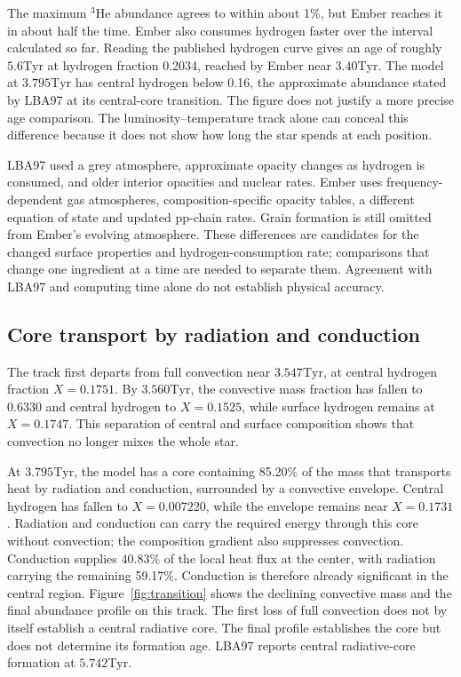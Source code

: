 \documentclass[11pt,letterpaper]{article}
\newcommand{\Tyr}{\mathrm{Tyr}}
\begin{document}
The maximum $^3$He abundance agrees to within about 1\%, but Ember reaches it
in about half the time. Ember also consumes hydrogen faster over the interval
calculated so far. Reading the published hydrogen curve gives an age of
roughly $5.6\Tyr$ at hydrogen fraction 0.2034, reached by Ember near
$3.40\Tyr$. The model at $3.795\Tyr$ has central hydrogen below 0.16,
the approximate abundance stated by LBA97 at its central-core transition. The figure does not justify a more precise age comparison.
The luminosity--temperature track alone can conceal this difference because
it does not show how long the star spends at each position.

LBA97 used a grey atmosphere, approximate opacity changes as hydrogen is
consumed, and older interior opacities and nuclear rates. Ember uses
frequency-dependent gas atmospheres, composition-specific opacity tables,
a different equation of state and updated pp-chain rates. Grain formation
is still omitted from Ember's evolving atmosphere. These differences are
candidates for the changed surface properties and hydrogen-consumption rate;
comparisons that change one ingredient at a time are needed to separate them.
Agreement with LBA97 and computing time alone do not establish physical
accuracy.

\subsection{Core transport by radiation and conduction}
The track first departs from full convection near $3.547\Tyr$, at central
hydrogen fraction $X=0.1751$. By $3.560\Tyr$, the convective mass fraction
has fallen to 0.6330 and central hydrogen to $X=0.1525$, while surface
hydrogen remains at $X=0.1747$. This separation of central and surface
composition shows that convection no longer mixes the whole star.

At $3.795\Tyr$, the model has a core containing 85.20\% of the mass that
transports heat by radiation and conduction, surrounded by a convective envelope.
Central hydrogen has fallen to $X=0.007220$, while the envelope remains
near $X=0.1731$. Radiation and conduction can carry the required energy
through this core without convection; the composition gradient also suppresses
convection. Conduction supplies 40.83\% of the local heat flux at the center,
with radiation carrying the remaining 59.17\%. Conduction is therefore already
significant in the central region. Figure~\ref{fig:transition} shows
the declining convective mass and the final abundance profile on this track.
The first loss of full convection does not by itself establish a central
radiative core. The final profile establishes the core but does not determine its formation
age. LBA97 reports central
radiative-core formation at $5.742\Tyr$.
\end{document}
